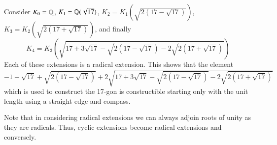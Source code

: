 \begin{eg}
    Consider $K_0 = \mathbb Q$, $K_1 = \mathbb Q(\sqrt{17})$, $K_2 = K_1(\sqrt{2(17-\sqrt{17})})$, $K_3 = K_2(\sqrt{2(17+\sqrt{17})})$, and finally \begin{equation*}
        K_4 = K_3\left(\sqrt{17+3\sqrt{17}-\sqrt{2(17-\sqrt{17})}-2\sqrt{2(17+\sqrt{17})}}\right)
    \end{equation*}
    Each of these extensions is a radical extension. This shows that the element \begin{equation*}
        -1+\sqrt{17}+\sqrt{2(17-\sqrt{17})} +2\sqrt{17+3\sqrt{17}-\sqrt{2(17-\sqrt{17})}-2\sqrt{2(17+\sqrt{17})}}
    \end{equation*}
    which is used to construct the 17-gon is constructible starting only with the unit length using a straight edge and compass.
\end{eg}

Note that in considering radical extensions we can always adjoin roots of unity as they are radicals. Thus, cyclic extensions become radical extensions and conversely.

